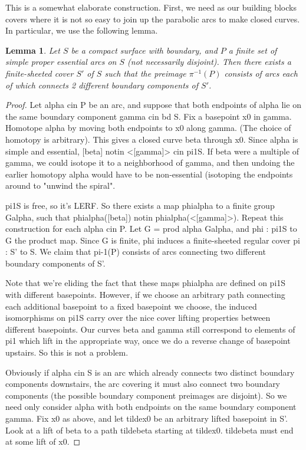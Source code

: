 \documentclass[12pt]{amsart}
\newtheorem{lemma}[theorem]{Lemma}
\theoremstyle{definition}
\theoremstyle{remark}
\begin{document}
This is a somewhat elaborate construction. First, we need as our building
blocks covers where it is not so easy to join up the parabolic arcs to make
closed curves. In particular, we use the following lemma.

\begin{lemma}

Let $S$ be a compact surface with boundary, and $P$ a finite set of simple
proper essential arcs on $S$ (not necessarily disjoint).  Then there exists
a finite-sheeted cover $S'$ of $S$ such that the preimage $\pi^{-1}(P)$
consists of arcs each of which connects 2 different boundary components of
$S'$.

\end{lemma}

\begin{proof}

Let alpha cin P be an arc, and suppose that both endpoints of alpha lie on the
same boundary component gamma cin bd S. Fix a basepoint x0 in gamma.  Homotope
alpha by moving both endpoints to x0 along gamma. (The choice of homotopy is
arbitrary). This gives a closed curve beta through x0. Since alpha is simple
and essential, [beta] notin <[gamma]> cin pi1S. If beta were a multiple of
gamma, we could isotope it to a neighborhood of gamma, and then undoing the
earlier homotopy alpha would have to be non-essential (isotoping the endpoints
around to "unwind the spiral".

pi1S is free, so it's LERF. So there exists a map phialpha to a finite group
Galpha, such that phialpha([beta]) notin phialpha(<[gamma]>). Repeat this
construction for each alpha cin P. Let G = prod alpha Galpha, and phi : pi1S to
G the product map. Since G is finite, phi induces a finite-sheeted regular
cover pi : S' to S. We claim that pi-1(P) consists of arcs connecting two
different boundary components of S'.

Note that we're eliding the fact that these maps phialpha are defined on pi1S
with different basepoints. However, if we choose an arbitrary path connecting
each additional basepoint to a fixed basepoint we choose, the induced
isomorphisms on pi1S carry over the nice cover lifting properties between
different basepoints. Our curves beta and gamma still correspond to elements of
pi1 which lift in the appropriate way, once we do a reverse change of basepoint
upstairs. So this is not a problem.

Obviously if alpha cin S is an arc which already connects two distinct boundary
components downstairs, the arc covering it must also connect two boundary
components (the possible boundary component preimages are disjoint). So we need
only consider alpha with both endpoints on the same boundary component gamma.
Fix x0 as above, and let tildex0 be an arbitrary lifted basepoint in S'.  Look
at a lift of beta to a path tildebeta starting at tildex0. tildebeta must end
at some lift of x0.


\end{proof}
\end{document}
